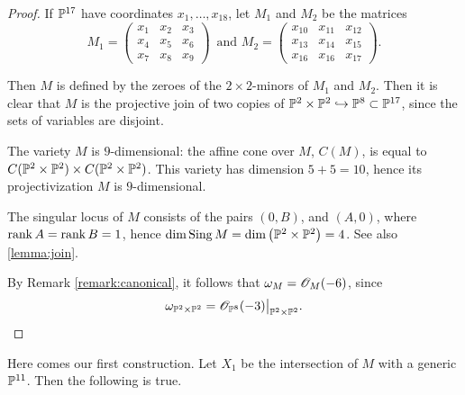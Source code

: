 \begin{proof}
If $\P^{17}$ have coordinates $x_1,\ldots,x_{18}$, let $M_1$ and $M_2$ be the matrices
\[
M_1 = \begin{pmatrix}
x_1 & x_2 & x_3 \\
x_4 & x_5 & x_6 \\
x_7 & x_8 & x_9 
\end{pmatrix}\,
\text{ and }
M_2 = \begin{pmatrix}
x_{10} & x_{11} & x_{12} \\
x_{13} & x_{14} & x_{15} \\
x_{16} & x_{16} & x_{17}
\end{pmatrix}.
\]

Then $M$ is defined by the zeroes of the $2 \times 2$-minors of $M_1$ and $M_2$. Then it is clear that $M$ is the projective join of two copies of $\mathbb P^2 \times \mathbb P^2 \hookrightarrow \mathbb P^8 \subset \P^{17}$, since the sets of variables are disjoint.

The variety $M$ is $9$-dimensional: the affine cone over $M$, $C(M)$, is equal to $C(\mathbb P^2 \times \P^2) \times C(\mathbb P^2 \times \P^2)$. This variety has dimension $5+5=10$, hence its projectivization $M$ is $9$-dimensional. 

The singular locus of $M$ consists of the pairs $(0,B)$, and $(A,0)$, where $\rank A= \rank B = 1$, hence $\dim \Sing M = \dim \left( \P^2 \times \P^2 \right) = 4$. See also \cref{lemma:join}.

By Remark \ref{remark:canonical}, it follows that $\omega_M = \OO_M(-6)$, since 
\[
\omega_{\P^2 \times \P^2} = \restr{\OO_{\P^8}(-3)}{\P^2 \times \P^2}.
\]
\end{proof}

Here comes our first construction. Let $X_1$ be the intersection of $M$ with a generic $\P^{11}$. Then the following is true.

